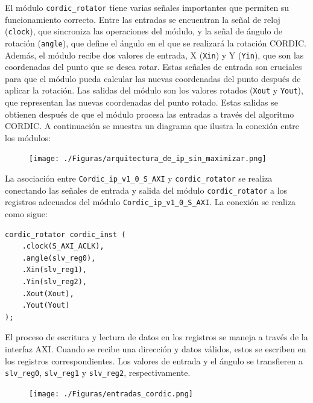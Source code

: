\documentclass[12pt,a4paper, twoside]{article} %
\begin{document}
El módulo \texttt{cordic\_rotator} tiene varias señales importantes que permiten su funcionamiento correcto. Entre las entradas se encuentran la señal de reloj (\texttt{clock}), que sincroniza las operaciones del módulo, y la señal de ángulo de rotación (\texttt{angle}), que define el ángulo en el que se realizará la rotación CORDIC. Además, el módulo recibe dos valores de entrada, X (\texttt{Xin}) y Y (\texttt{Yin}), que son las coordenadas del punto que se desea rotar. Estas señales de entrada son cruciales para que el módulo pueda calcular las nuevas coordenadas del punto después de aplicar la rotación. Las salidas del módulo son los valores rotados (\texttt{Xout} y \texttt{Yout}), que representan las nuevas coordenadas del punto rotado. Estas salidas se obtienen después de que el módulo procesa las entradas a través del algoritmo CORDIC. A continuación se muestra un diagrama que ilustra la conexión entre los módulos:


\begin{figure}[ht]
\centering
\texttt{[image: ./Figuras/arquitectura\_de\_ip\_sin\_maximizar.png]}
\label{fig:Diagrama de conexión del módulo minimizado}
\end{figure}
   

La asociación entre \texttt{Cordic\_ip\_v1\_0\_S\_AXI} y \texttt{cordic\_rotator} se realiza conectando las señales de entrada y salida del módulo \texttt{cordic\_rotator} a los registros adecuados del módulo \texttt{Cordic\_ip\_v1\_0\_S\_AXI}. La conexión se realiza como sigue:

\begin{verbatim}
cordic_rotator cordic_inst (
    .clock(S_AXI_ACLK),
    .angle(slv_reg0),
    .Xin(slv_reg1),
    .Yin(slv_reg2),
    .Xout(Xout),
    .Yout(Yout)
);
\end{verbatim}

El proceso de escritura y lectura de datos en los registros se maneja a través de la interfaz AXI. Cuando se recibe una dirección y datos válidos, estos se escriben en los registros correspondientes. Los valores de entrada y el ángulo se transfieren a \texttt{slv\_reg0}, \texttt{slv\_reg1} y \texttt{slv\_reg2}, respectivamente.

\begin{figure}[ht]
\centering
\texttt{[image: ./Figuras/entradas\_cordic.png]}
\label{fig:Diagrama de conexión del módulo minimizado}
\end{figure}
\end{document}
